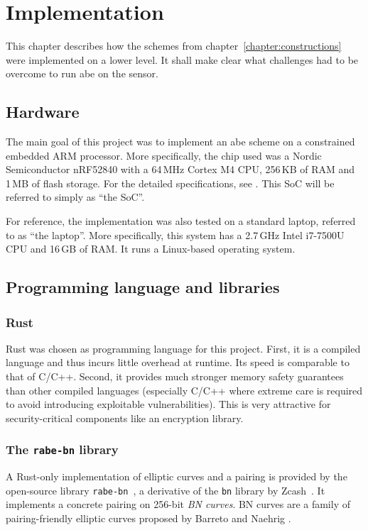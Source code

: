 \chapter{Implementation}

This chapter describes how the schemes from chapter~\ref{chapter:constructions} were implemented on a lower level.
It shall make clear what challenges had to be overcome to run \acrlong{abe} on the sensor.

\section{Hardware}

The main goal of this project was to implement an \acrshort{abe} scheme on a constrained embedded ARM processor.
More specifically, the chip used was a Nordic Semiconductor nRF52840 with a 64\,MHz Cortex M4 CPU, 256\,KB of RAM and 1\,MB of flash storage.
For the detailed specifications, see \cite{nordic_semiconductor_nrf52840_nodate}.
This SoC will be referred to simply as ``the SoC''.

For reference, the implementation was also tested on a standard laptop, referred to as ``the laptop''.
More specifically, this system has a 2.7\,GHz Intel i7-7500U CPU and 16\,GB of RAM.
It runs a Linux-based operating system.

\section{Programming language and libraries}

\subsection*{Rust}

Rust was chosen as programming language for this project.
First, it is a compiled language and thus incurs little overhead at runtime. Its speed is comparable to that of C/C++.
Second, it provides much stronger memory safety guarantees than other compiled languages (especially C/C++ where extreme care is required to avoid introducing exploitable vulnerabilities).
This is very attractive for security-critical components like an encryption library.

\subsection*{The \texttt{rabe-bn} library}

A Rust-only implementation of elliptic curves and a pairing is provided by the open-source library \texttt{rabe-bn}~\cite{bowe_rabe-bn_nodate}, a derivative of the \texttt{bn} library by Zcash~\cite{bowe_bn_2016}.
It implements a concrete pairing on 256-bit \emph{BN curves}.
BN curves are a family of pairing-friendly elliptic curves proposed by Barreto and Naehrig \cite{barreto_pairing-friendly_2006}.

